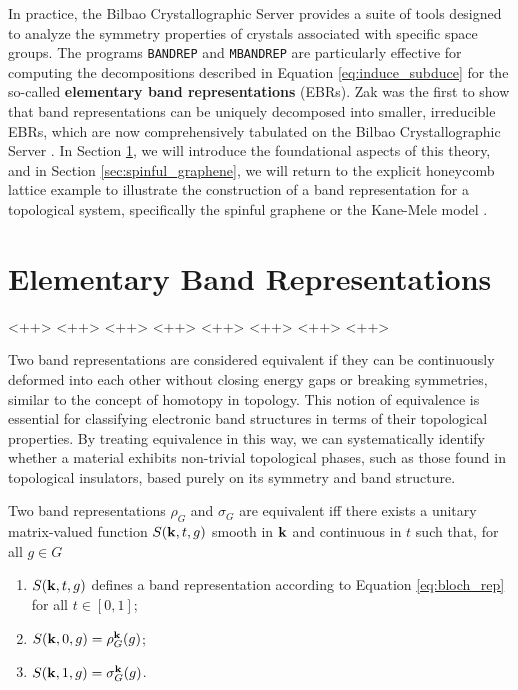 In practice, the Bilbao Crystallographic Server \cite{bilbao_1} provides a suite of tools designed to analyze the symmetry properties of crystals associated with specific space groups. The programs \texttt{BANDREP} and \texttt{MBANDREP} are particularly effective for computing the decompositions described in Equation \ref{eq:induce_subduce} for the so-called \textbf{elementary band representations} (EBRs). Zak \cite{zak1980, zak1981} was the first to show that band representations can be uniquely decomposed into smaller, irreducible EBRs, which are now comprehensively tabulated on the Bilbao Crystallographic Server \cite{topological_quantum_chemistry2017, bilbao_1}. In Section \ref{sec:EBRs_topological}, we will introduce the foundational aspects of this theory, and in Section \ref{sec:spinful_graphene}, we will return to the explicit honeycomb lattice example to illustrate the construction of a band representation for a topological system, specifically the spinful graphene or the Kane-Mele model \cite{kane-mele2005}.

\section{Elementary Band Representations} \label{sec:EBRs_topological}

<++> <++> <++> <++> <++> <++> <++> <++>

Two band representations are considered equivalent if they can be continuously deformed into each other without closing energy gaps or breaking symmetries, similar to the concept of homotopy in topology. This notion of equivalence is essential for classifying electronic band structures in terms of their topological properties. By treating equivalence in this way, we can systematically identify whether a material exhibits non-trivial topological phases, such as those found in topological insulators, based purely on its symmetry and band structure.

\begin{definition} \label{def:equiv_bandrep}
Two band representations $\rho_G$ and $\sigma_G$ are equivalent iff there exists a unitary matrix-valued function $S({\vb{k}},t,g)$ smooth in ${\vb{k}}$ and continuous in $t$ such that, for all $g \in G$
\begin{enumerate}
\item $S({\vb{k}}, t, g)$ defines a band representation according to Equation \ref{eq:bloch_rep} for all $t \in [0,1]$;
\item $S({\vb{k}}, 0, g) = \rho_G^{\vb{k}}(g)$;
\item $S({\vb{k}}, 1, g) = \sigma_G^{\vb{k}}(g)$.
\end{enumerate}
\end{definition}

